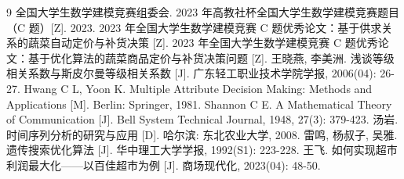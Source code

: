
\begin{thebibliography}{9}
 全国大学生数学建模竞赛组委会. 2023 年高教社杯全国大学生数学建模竞赛题目（C 题）[Z]. 2023.
 2023 年全国大学生数学建模竞赛 C 题优秀论文：基于供求关系的蔬菜自动定价与补货决策 [Z].
 2023 年全国大学生数学建模竞赛 C 题优秀论文：基于优化算法的蔬菜商品定价与补货决策问题 [Z].
 王晓燕, 李美洲. 浅谈等级相关系数与斯皮尔曼等级相关系数 [J]. 广东轻工职业技术学院学报, 2006(04): 26-27.
 Hwang C L, Yoon K. Multiple Attribute Decision Making: Methods and Applications [M]. Berlin: Springer, 1981.
 Shannon C E. A Mathematical Theory of Communication [J]. Bell System Technical Journal, 1948, 27(3): 379-423.
 汤岩. 时间序列分析的研究与应用 [D]. 哈尔滨: 东北农业大学, 2008.
 雷鸣, 杨叔子, 吴雅. 遗传搜索优化算法 [J]. 华中理工大学学报, 1992(S1): 223-228.
 王飞. 如何实现超市利润最大化——以百佳超市为例 [J]. 商场现代化, 2023(04): 48-50.
\end{thebibliography}
